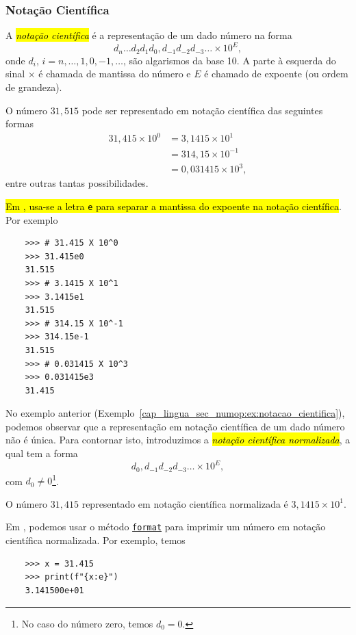 \subsubsection{Notação Científica}

A \hl{\emph{notação científica}} é a representação de um dado número na forma
\begin{equation}
  d_{n}\ldots d_2d_1d_0,d_{-1}d_{-2}d_{-3}\ldots \times 10^{E},
\end{equation}
onde $d_i$, $i=n, \ldots, 1, 0, -1, \ldots$, são algarismos da base 10. A parte à esquerda do sinal $\times$ é chamada de mantissa do número e $E$ é chamado de expoente (ou ordem de grandeza).

\begin{ex}\label{cap_lingua_sec_numop:ex:notacao_cientifica}
  O número $31,515$ pode ser representado em notação científica das seguintes formas
  \begin{align}
    31,415\times 10^0 &= 3,1415\times 10^{1} \\
                      &= 314,15\times 10^{-1} \\
                      &= 0,031415\times 10^{3},
  \end{align}
  entre outras tantas possibilidades.

  \hl{Em {\python}, usa-se a letra {\lstinline+e+} para separar a mantissa do expoente na notação científica}. Por exemplo
  \begin{lstlisting}
    >>> # 31.415 X 10^0
    >>> 31.415e0
    31.515
    >>> # 3.1415 X 10^1
    >>> 3.1415e1
    31.515
    >>> # 314.15 X 10^-1
    >>> 314.15e-1
    31.515
    >>> # 0.031415 X 10^3
    >>> 0.031415e3
    31.415
  \end{lstlisting}
\end{ex}

No exemplo anterior (Exemplo~\ref{cap_lingua_sec_numop:ex:notacao_cientifica}), podemos observar que a representação em notação científica de um dado número não é única. Para contornar isto, introduzimos a \hl{\emph{notação científica normalizada}}, a qual tem a forma
\begin{equation}
  d_0,d_{-1}d_{-2}d_{-3}\ldots\times 10^{E},
\end{equation}
com $d_0 \neq 0$\footnote{No caso do número zero, temos $d_0=0$.}.

\begin{ex}
  O número $31,415$ representado em notação científica normalizada é $3,1415\times 10^{1}$.

  Em {\python}, podemos usar o método \href{https://docs.python.org/3.8/library/string.html#formatspec}{\lstinline+format+} para imprimir um número em notação científica normalizada. Por exemplo, temos
  \begin{lstlisting}
    >>> x = 31.415
    >>> print(f"{x:e}")
    3.141500e+01
  \end{lstlisting}
\end{ex}

